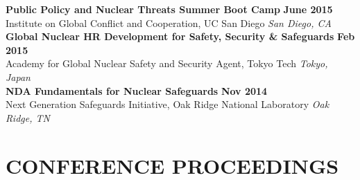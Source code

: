 \documentclass[margin, 10pt]{style/res} %
\begin{document}
\begin{resume}
{\bf Public Policy and Nuclear Threats Summer Boot Camp} \hfill {\bf June 2015}\\
{\small{Institute on Global Conflict and Cooperation, UC San Diego}} \hfill {\sl San Diego, CA}\\[-3.5ex]

{\bf Global Nuclear HR Development for Safety, Security \& Safeguards} \hfill {\bf Feb 2015}\\
{\small{Academy for Global Nuclear Safety and Security Agent, Tokyo Tech}}  \hfill {\sl Tokyo, Japan}\\[-3.5ex]

{\bf NDA Fundamentals for Nuclear Safeguards}   \hfill {\bf Nov 2014}\\
{\small{Next Generation Safeguards Initiative, Oak Ridge National Laboratory}} \hfill  {\sl Oak Ridge, TN}












\section{\small{CONFERENCE PROCEEDINGS}}


\end{resume}
\end{document}
